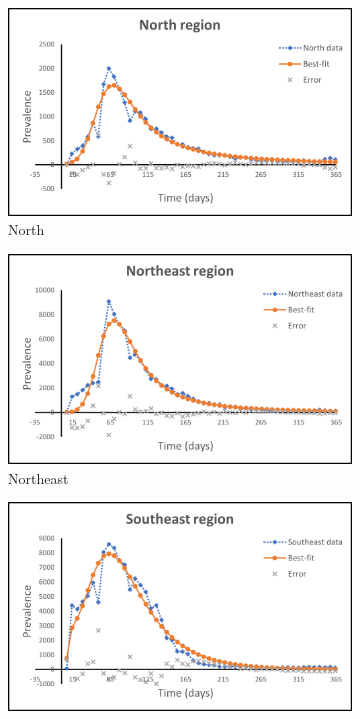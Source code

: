\documentclass[10pt,letterpaper]{article}
\begin{document}
\begin{figure}
     \centering
     \begin{subfigure}[b]{0.3\textwidth}
         \centering
         \includegraphics[width=\textwidth]{Zika_PE_figs/N.png}
         \caption{North}
         \label{fig:north_PE}
     \end{subfigure}
     \hfill
     \begin{subfigure}[b]{0.3\textwidth}
         \centering
         \includegraphics[width=\textwidth]{Zika_PE_figs/NE.png}
         \caption{Northeast}
         \label{fig:NE_PE}
     \end{subfigure}
     \hfill
     \begin{subfigure}[b]{0.3\textwidth}
         \centering
         \includegraphics[width=\textwidth]{Zika_PE_figs/SE.png}

\end{subfigure}
\end{figure}
\end{document}

